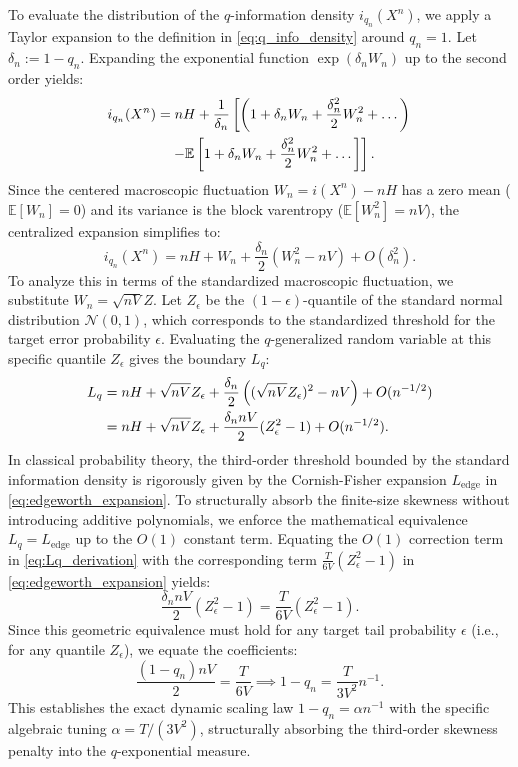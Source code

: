 \documentclass[conference]{IEEEtran}
\begin{document}
\begin{IEEEproof}
To evaluate the distribution of the $q$-information density $i_{q_n}(X^n)$, we apply a Taylor expansion to the definition in \eqref{eq:q_info_density} around $q_n = 1$. Let $\delta_n := 1-q_n$. Expanding the exponential function $\exp(\delta_n W_n)$ up to the second order yields:
\begin{align}
    i_{q_n}(X^n) &= nH + \frac{1}{\delta_n} \left[ \left(1 + \delta_n W_n + \frac{\delta_n^2}{2}W_n^2 + \dots \right) \right. \notag \\
    &\quad \left. - \mathbb{E}\left[ 1 + \delta_n W_n + \frac{\delta_n^2}{2}W_n^2 + \dots \right] \right].
\end{align}
Since the centered macroscopic fluctuation $W_n = i(X^n) - nH$ has a zero mean ($\mathbb{E}[W_n] = 0$) and its variance is the block varentropy ($\mathbb{E}[W_n^2] = nV$), the centralized expansion simplifies to:
\begin{equation}
    i_{q_n}(X^n) = nH + W_n + \frac{\delta_n}{2}(W_n^2 - nV) + O(\delta_n^2).
    \label{eq:iq_expansion_Wn}
\end{equation}
To analyze this in terms of the standardized macroscopic fluctuation, we substitute $W_n = \sqrt{nV}Z$. Let $Z_\epsilon$ be the $(1-\epsilon)$-quantile of the standard normal distribution $\mathcal{N}(0,1)$, which corresponds to the standardized threshold for the target error probability $\epsilon$. Evaluating the $q$-generalized random variable at this specific quantile $Z_\epsilon$ gives the boundary $L_q$:
\begin{align}
    L_q &= nH + \sqrt{nV}Z_\epsilon + \frac{\delta_n}{2} \left( (\sqrt{nV}Z_\epsilon)^2 - nV \right) + O(n^{-1/2}) \notag \\
    &= nH + \sqrt{nV}Z_\epsilon + \frac{\delta_n nV}{2}(Z_\epsilon^2 - 1) + O(n^{-1/2}).
    \label{eq:Lq_derivation}
\end{align}
In classical probability theory, the third-order threshold bounded by the standard information density is rigorously given by the Cornish-Fisher expansion $L_{\text{edge}}$ in \eqref{eq:edgeworth_expansion}. To structurally absorb the finite-size skewness without introducing additive polynomials, we enforce the mathematical equivalence $L_q = L_{\text{edge}}$ up to the $O(1)$ constant term. Equating the $O(1)$ correction term in \eqref{eq:Lq_derivation} with the corresponding term $\frac{T}{6V}(Z_\epsilon^2 - 1)$ in \eqref{eq:edgeworth_expansion} yields:
\begin{equation}
    \frac{\delta_n nV}{2}(Z_\epsilon^2 - 1) = \frac{T}{6V}(Z_\epsilon^2 - 1).
\end{equation}
Since this geometric equivalence must hold for any target tail probability $\epsilon$ (i.e., for any quantile $Z_\epsilon$), we equate the coefficients:
\begin{equation}
    \frac{(1-q_n)nV}{2} = \frac{T}{6V} \implies 1-q_n = \frac{T}{3V^2}n^{-1}.
\end{equation}
This establishes the exact dynamic scaling law $1-q_n = \alpha n^{-1}$ with the specific algebraic tuning $\alpha = T/(3V^2)$, structurally absorbing the third-order skewness penalty into the $q$-exponential measure.
\end{IEEEproof}
\end{document}
